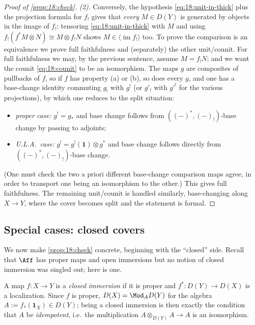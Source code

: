 \begin{proof}[Proof of \cref{prop:18:check}]
\emph{(2).} Conversely, the hypothesis \eqref{eq:18:unit-in-thick} plus the
projection formula for $f_!$ gives that \emph{every} $M\in D(Y)$ is generated by
objects in the image of $f_!$: tensoring \eqref{eq:18:unit-in-thick} with $M$ and
using $f_!(f^*M\otimes N)\cong M\otimes f_!N$ shows $M\in\langle\operatorname{im}
f_!\rangle$ too. To prove the comparison is an equivalence we prove full
faithfulness and (separately) the other unit/counit. For full faithfulness we may,
by the previous sentence, assume $M=f_!N$; and we want the counit
\eqref{eq:18:counit} to be an isomorphism. The maps $g$ are composites of
pullbacks of $f$, so if $f$ has property (a) or (b), so does every $g$, and one has
a base-change identity commuting $g_!$ with $g^!$ (or $g'_!$ with $g'^!$ for the
various projections), by which one reduces to the split situation:
\begin{itemize}
\item \emph{proper case:} $g^!=g_*$ and base change follows from
$((-)^*,(-)_!)$-base change by passing to adjoints;
\item \emph{U.L.A.\ case:} $g^!=g^!(\mathbf 1)\otimes g^*$ and base change follows
directly from $((-)^*,(-)_!)$-base change.
\end{itemize}
(One must check the two a priori different base-change comparison maps agree, in
order to transport one being an isomorphism to the other.) This gives full
faithfulness. The remaining unit/counit is handled similarly, base-changing along
$X\to Y$, where the cover becomes split and the statement is formal.
\end{proof}

\subsection{Special cases: closed covers}
\label{subsec:18:closed}

We now make \cref{prop:18:check} concrete, beginning with the ``closed'' side.
Recall that $\Aff$ has proper maps and open immersions but no notion of closed
immersion was singled out; here is one.

\begin{definition}
\label{def:18:closed}
A map $f\colon X\to Y$ is a \emph{closed immersion} if it is proper and
$f^*\colon D(Y)\to D(X)$ is a localization. Since $f$ is proper, $D(X)=\Mod_{A}
D(Y)$ for the algebra $A:=f_*(\mathbf 1_X)\in D(Y)$; being a closed immersion is
then exactly the condition that $A$ be \emph{idempotent}, i.e.\ the multiplication
$A\otimes_{D(Y)}A\to A$ is an isomorphism.
\end{definition}

